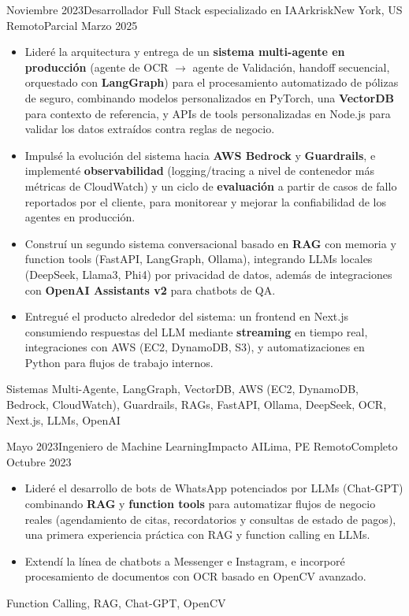 \begin{experiences}
\emptySeparator
\experience
  {Noviembre 2023}{Desarrollador Full Stack especializado en IA}{Arkrisk}{New York, US}
  {Remoto}{Parcial}
  {Marzo 2025} {
    \begin{itemize}
      \item Lideré la arquitectura y entrega de un \textbf{sistema multi-agente en producción} (agente de OCR \(\to\) agente de Validación, handoff secuencial, orquestado con \textbf{LangGraph}) para el procesamiento automatizado de pólizas de seguro, combinando modelos personalizados en PyTorch, una \textbf{VectorDB} para contexto de referencia, y APIs de tools personalizadas en Node.js para validar los datos extraídos contra reglas de negocio.
      \item Impulsé la evolución del sistema hacia \textbf{AWS Bedrock} y \textbf{Guardrails}, e implementé \textbf{observabilidad} (logging/tracing a nivel de contenedor más métricas de CloudWatch) y un ciclo de \textbf{evaluación} a partir de casos de fallo reportados por el cliente, para monitorear y mejorar la confiabilidad de los agentes en producción.
      \item Construí un segundo sistema conversacional basado en \textbf{RAG} con memoria y function tools (FastAPI, LangGraph, Ollama), integrando LLMs locales (DeepSeek, Llama3, Phi4) por privacidad de datos, además de integraciones con \textbf{OpenAI Assistants v2} para chatbots de QA.
      \item Entregué el producto alrededor del sistema: un frontend en Next.js consumiendo respuestas del LLM mediante \textbf{streaming} en tiempo real, integraciones con AWS (EC2, DynamoDB, S3), y automatizaciones en Python para flujos de trabajo internos.
    \end{itemize}
  }
  {{Sistemas Multi-Agente}, LangGraph, VectorDB, {AWS (EC2, DynamoDB, Bedrock, CloudWatch)}, Guardrails, RAGs, FastAPI, Ollama, DeepSeek, OCR, Next.js, LLMs, OpenAI}

\emptySeparator
\experience
  {Mayo 2023}{Ingeniero de Machine Learning}{Impacto AI}{Lima, PE}
  {Remoto}{Completo}
  {Octubre 2023} {
    \begin{itemize}
      \item Lideré el desarrollo de bots de WhatsApp potenciados por LLMs (Chat-GPT) combinando \textbf{RAG} y \textbf{function tools} para automatizar flujos de negocio reales (agendamiento de citas, recordatorios y consultas de estado de pagos), una primera experiencia práctica con RAG y function calling en LLMs.
      \item Extendí la línea de chatbots a Messenger e Instagram, e incorporé procesamiento de documentos con OCR basado en OpenCV avanzado.
    \end{itemize}
  }
  {{Function Calling}, RAG, Chat-GPT, OpenCV}


\end{experiences}
